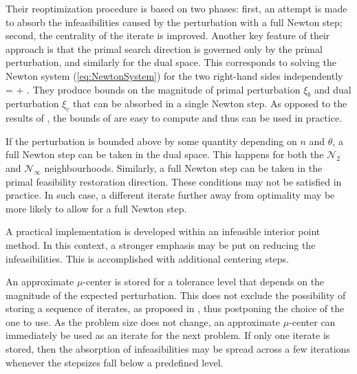 Their reoptimization procedure is based on two phases: first, an attempt 
is made to absorb the infeasibilities caused by the perturbation with a full 
Newton step; second, the centrality of the iterate is improved.
Another key feature of their approach is that the primal search 
direction is governed only by the primal perturbation, and similarly 
for the dual space. This corresponds to solving the Newton system 
(\ref{eq:NewtonSystem}) for the two right-hand sides independently
%
\be \label{eq:NewtonSystem2}
 = 
\left[ \begin{array}{c}
    \xi_b \\ 0 \\ 0
  \end{array} \right] +
\left[ \begin{array}{c}
    0 \\ \xi_c \\ 0
  \end{array} \right].
\ee
%
They produce bounds on the magnitude of primal perturbation $\xi_b$ 
and dual perturbation $\xi_c$ that can be absorbed in a single 
Newton step. As opposed to the results of \cite{YildirimWright}, 
the bounds of \cite{GondzioGrothey03} are easy to compute and 
thus can be used in practice.

If the perturbation is bounded above by some quantity depending 
on $n$ and $\theta$, a full Newton step can be taken in the dual space. 
This happens for both the $\mathcal{N}_2$ and $\mathcal{N}_\infty$ 
neighbourhoods. Similarly, a full Newton step can be taken in the 
primal feasibility restoration direction. These conditions may not 
be satisfied in practice. In such case, a different iterate further 
away from optimality may be more likely to allow for a full Newton step.

A practical implementation is developed within an infeasible interior 
point method. In this context, a stronger emphasis may be put on 
reducing the infeasibilities. This is accomplished with additional 
centering steps.

An approximate $\mu$-center is stored for a tolerance level that 
depends on the magnitude of the expected perturbation. This does not 
exclude the possibility of storing a sequence of iterates, as proposed 
in \cite{YildirimWright}, thus postponing the choice of the one to 
use.
As the problem size does not change, an approximate $\mu$-center 
can immediately be used as an iterate for the next problem.
If only one iterate is stored, then the absorption of infeasibilities 
may be spread across a few iterations whenever the stepsizes fall 
below a predefined level.

